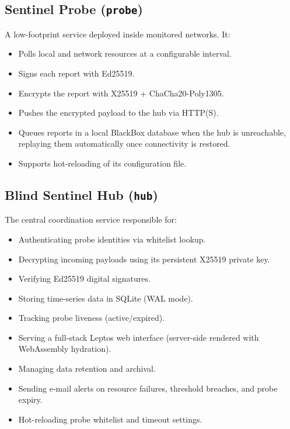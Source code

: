 \documentclass[12pt]{report}
\begin{document}
\subsection{Sentinel Probe (\texttt{probe})}

A low-footprint service deployed inside monitored networks. It:

\begin{itemize}
    \item Polls local and network resources at a configurable interval.
    \item Signs each report with Ed25519.
    \item Encrypts the report with X25519 + ChaCha20-Poly1305.
    \item Pushes the encrypted payload to the hub via HTTP(S).
    \item Queues reports in a local BlackBox database when the hub is
          unreachable, replaying them automatically once connectivity is
          restored.
    \item Supports hot-reloading of its configuration file.
\end{itemize}

\subsection{Blind Sentinel Hub (\texttt{hub})}

The central coordination service responsible for:

\begin{itemize}
    \item Authenticating probe identities via whitelist lookup.
    \item Decrypting incoming payloads using its persistent X25519 private key.
    \item Verifying Ed25519 digital signatures.
    \item Storing time-series data in SQLite (WAL mode).
    \item Tracking probe liveness (active/expired).
    \item Serving a full-stack Leptos web interface (server-side rendered with
          WebAssembly hydration).
    \item Managing data retention and archival.
    \item Sending e-mail alerts on resource failures, threshold breaches, and
          probe expiry.
    \item Hot-reloading probe whitelist and timeout settings.
\end{itemize}
\end{document}
